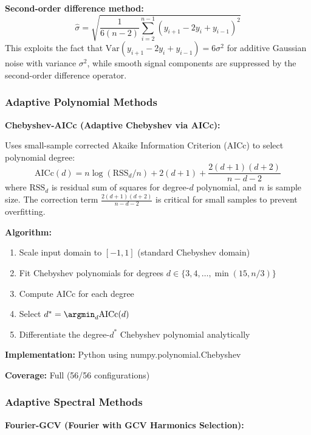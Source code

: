 \textbf{Second-order difference method:}
\begin{equation}
\hat{\sigma} = \sqrt{\frac{1}{6(n-2)} \sum_{i=2}^{n-1} (y_{i+1} - 2y_i + y_{i-1})^2}
\end{equation}
This exploits the fact that $\text{Var}(y_{i+1} - 2y_i + y_{i-1}) = 6\sigma^2$ for additive Gaussian noise with variance $\sigma^2$, while smooth signal components are suppressed by the second-order difference operator.

\subsubsection{Adaptive Polynomial Methods}

\textbf{Chebyshev-AICc (Adaptive Chebyshev via AICc):}

Uses small-sample corrected Akaike Information Criterion \cite{hurvich1989regression} (AICc) to select polynomial degree:
\begin{equation}
\text{AICc}(d) = n \log(\text{RSS}_d/n) + 2(d+1) + \frac{2(d+1)(d+2)}{n-d-2}
\end{equation}
where $\text{RSS}_d$ is residual sum of squares for degree-$d$ polynomial, and $n$ is sample size. The correction term $\frac{2(d+1)(d+2)}{n-d-2}$ is critical for small samples to prevent overfitting.

\textbf{Algorithm:}
\begin{enumerate}
    \item Scale input domain to $[-1, 1]$ (standard Chebyshev domain)
    \item Fit Chebyshev polynomials for degrees $d \in \{3, 4, \ldots, \min(15, n/3)\}$
    \item Compute AICc for each degree
    \item Select $d^* = \argmin_d \text{AICc}(d)$
    \item Differentiate the degree-$d^*$ Chebyshev polynomial analytically
\end{enumerate}

\textbf{Implementation:} Python using numpy.polynomial.Chebyshev

\textbf{Coverage:} Full (56/56 configurations)

\subsubsection{Adaptive Spectral Methods}

\textbf{Fourier-GCV (Fourier with GCV Harmonics Selection):}

